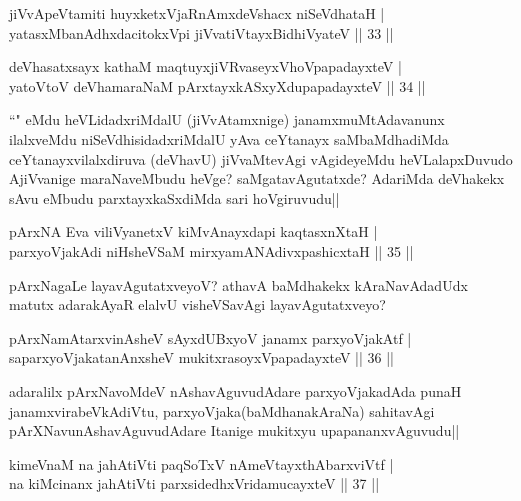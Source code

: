 
\begin{shl}
jiVvApeVtamiti huyxketxVjaRnAmxdeVshacx niSeVdhataH |\\
yatasxMbanAdhxdacitokxV\s pi jiVvatiVtayxBidhiVyateV \hfill || 33 ||
\end{shl}

\begin{shl}
deVhasatxsayx kathaM maqtuyxjiVRvaseyxVhoVpapadayxteV |\\
yatoV\s toV deVhamaraNaM pArxtayxkASxyXdupapadayxteV \hfill || 34 ||
\end{shl}

\begin{artha}
``\stext" eMdu heVLidadxriMdalU (jiVvAtamxnige) janamxmuMtAdavanunx ilalxveMdu 
niSeVdhisidadxriMdalU yAva ceYtanayx saMbaMdhadiMda ceYtanayxvilalxdiruva (deVhavU) 
jiVvaMtevAgi vAgideyeMdu heVLalapxDuvudo AjiVvanige maraNaveMbudu heVge? 
saMgatavAgutatxde? AdariMda deVhakekx sAvu eMbudu parxtayxkaSxdiMda sari hoVgiruvudu||
\end{artha}


\begin{shl}
pArxNA Eva viliVyanetxV kiMvA\s nayxdapi kaqtasxnXtaH |\\
parxyoVjakAdi niHsheVSaM mirxyamANAdivxpashicxtaH \hfill || 35 ||
\end{shl}

\begin{artha}
pArxNagaLe layavAgutatxveyoV? athavA baMdhakekx kAraNavAdadUdx matutx adarakAyaR elalvU 
visheVSavAgi layavAgutatxveyo?
\end{artha}

\begin{shl}
pArxNamAtarxvinAsheV sAyxdUBxyoV janamx parxyoVjakAtf |\\
saparxyoVjakatanAnxsheV mukitxrasoyxVpapadayxteV \hfill || 36 ||
\end{shl}

\begin{artha}
adaralilx pArxNavoMdeV nAshavAguvudAdare parxyoVjakadAda punaH janamxvirabeVkAdiVtu, parxyoVjaka(baMdhanakAraNa) sahitavAgi pArXNavunAshavAguvudAdare Itanige mukitxyu upapananxvAguvudu||
\end{artha}

\begin{shl}
kimeVnaM na jahAtiVti paqSoTxV nAmeVtayxthAbarxviVtf |\\
na kiMcinanx jahAtiVti parxsidedhxVridamucayxteV \hfill || 37 ||
\end{shl}

